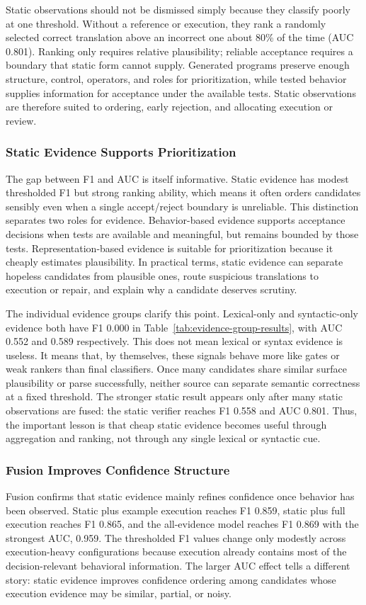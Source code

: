 ﻿\documentclass[conference]{IEEEtran}
\begin{document}
Static observations should not be dismissed simply because they classify poorly at one threshold. Without a reference or execution, they rank a randomly selected correct translation above an incorrect one about 80\% of the time (AUC 0.801). Ranking only requires relative plausibility; reliable acceptance requires a boundary that static form cannot supply. Generated programs preserve enough structure, control, operators, and roles for prioritization, while tested behavior supplies information for acceptance under the available tests. Static observations are therefore suited to ordering, early rejection, and allocating execution or review.

\subsubsection{Static Evidence Supports Prioritization}
The gap between F1 and AUC is itself informative. Static evidence has modest thresholded F1 but strong ranking ability, which means it often orders candidates sensibly even when a single accept/reject boundary is unreliable. This distinction separates two roles for evidence. Behavior-based evidence supports acceptance decisions when tests are available and meaningful, but remains bounded by those tests. Representation-based evidence is suitable for prioritization because it cheaply estimates plausibility. In practical terms, static evidence can separate hopeless candidates from plausible ones, route suspicious translations to execution or repair, and explain why a candidate deserves scrutiny.

The individual evidence groups clarify this point. Lexical-only and syntactic-only evidence both have F1 0.000 in Table~\ref{tab:evidence-group-results}, with AUC 0.552 and 0.589 respectively. This does not mean lexical or syntax evidence is useless. It means that, by themselves, these signals behave more like gates or weak rankers than final classifiers. Once many candidates share similar surface plausibility or parse successfully, neither source can separate semantic correctness at a fixed threshold. The stronger static result appears only after many static observations are fused: the static verifier reaches F1 0.558 and AUC 0.801. Thus, the important lesson is that cheap static evidence becomes useful through aggregation and ranking, not through any single lexical or syntactic cue.

\subsubsection{Fusion Improves Confidence Structure}
Fusion confirms that static evidence mainly refines confidence once behavior has been observed. Static plus example execution reaches F1 0.859, static plus full execution reaches F1 0.865, and the all-evidence model reaches F1 0.869 with the strongest AUC, 0.959. The thresholded F1 values change only modestly across execution-heavy configurations because execution already contains most of the decision-relevant behavioral information. The larger AUC effect tells a different story: static evidence improves confidence ordering among candidates whose execution evidence may be similar, partial, or noisy.
\end{document}
